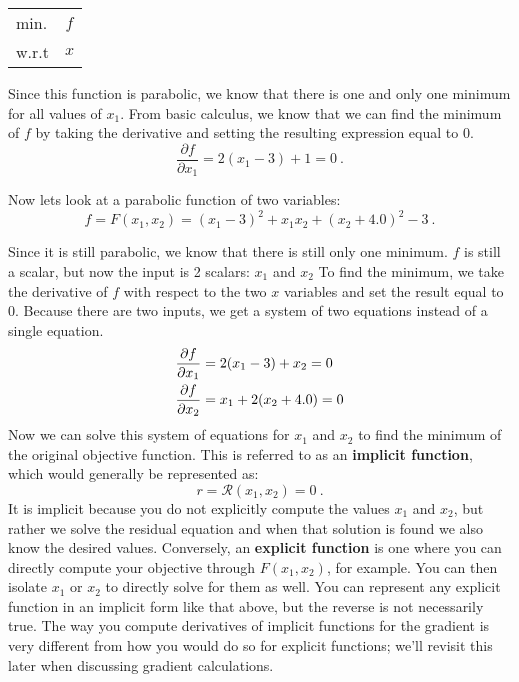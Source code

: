 \documentclass[conf]{new-aiaa}
\begin{document}
    \begin{table}[H]
        \centering
        \begin{tabular}{lc}
            \hline
            min. & $f$ \\
            w.r.t & $x$ \\ \hline
        \end{tabular}
    \end{table}


    Since this function is parabolic, we know that there is one and only one minimum for all values of $x_1$. 
    From basic calculus, we know that we can find the minimum of $f$ by taking the derivative and setting the resulting expression equal to 0. 
    \begin{equation}
        \frac{\partial f}{\partial x_1} = 2(x_1 - 3) + 1 = 0 \ . 
    \end{equation}

    Now lets look at a parabolic function of two variables: 
    \begin{equation}
        f = F(x_1,x_2) = (x_1 - 3)^2 + x_1 x_2 + (x_2 + 4.0)^2 - 3 \ . 
    \end{equation}

    Since it is still parabolic, we know that there is still only one minimum. 
    $f$ is still a scalar, but now the input is 2 scalars: $x_1$ and $x_2$
    To find the minimum, we take the derivative of $f$ with respect to the two $x$ variables and set the result equal to 0. 
    Because there are two inputs, we get a system of two equations instead of a single equation. 
    \begin{align}
        \frac{\partial f}{\partial x_1} &= 2(x_1 - 3) + x_2 = 0 \notag \\
        \frac{\partial f}{\partial x_2} &= x_1 + 2(x_2 + 4.0) = 0 \label{eq:linear_deriv}
    \end{align}
    Now we can solve this system of equations for $x_1$ and $x_2$ to find the minimum of the original objective function. 
    This is referred to as an \textbf{implicit function}, which would generally be represented as: 
    \begin{equation} 
    r = \mathcal{R}(x_1, x_2) = 0 \ . 
    \end{equation}
    It is implicit because you do not explicitly compute the values $x_1$ and $x_2$, but rather we solve the residual equation and when that solution is found we also know the desired values. 
    Conversely, an \textbf{explicit function} is one where you can directly compute your objective through $F(x_1, x_2)$, for example. 
    You can then isolate $x_1$ or $x_2$ to directly solve for them as well. 
    You can represent any explicit function in an implicit form like that above, but the reverse is not necessarily true.
    The way you compute derivatives of implicit functions for the gradient is very different from how you would do so for explicit functions; we'll revisit this later when discussing gradient calculations.
\end{document}
